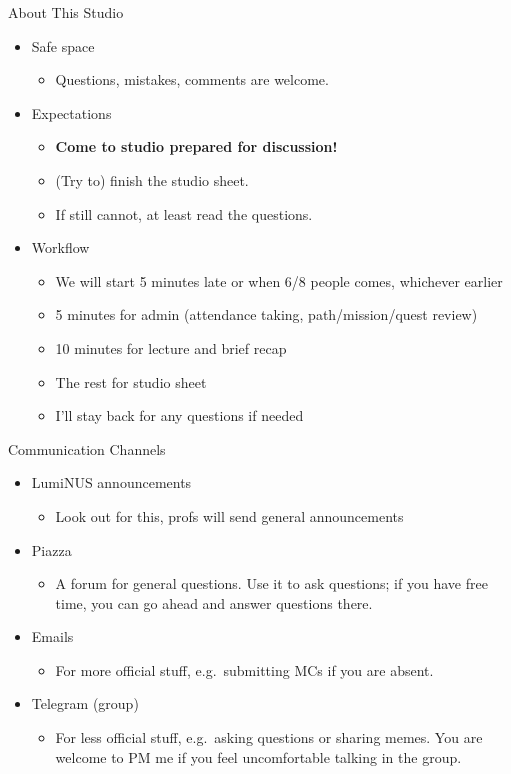 \documentclass[10pt]{beamer}
\begin{document}
\begin{frame}[fragile]{About This Studio}
\begin{itemize}
  \item Safe space
  \begin{itemize}
    \item Questions, mistakes, comments are welcome.
  \end{itemize}
  \item Expectations
  \begin{itemize}
    \item \textbf{Come to studio prepared for discussion!}
    \item (Try to) finish the studio sheet.
    \item If still cannot, at least read the questions. 
  \end{itemize}
  \item Workflow
  \begin{itemize}
    \item We will start 5 minutes late or when 6/8 people comes, whichever earlier
    \item 5 minutes for admin (attendance taking, path/mission/quest review)
    \item 10 minutes for lecture and brief recap
    \item The rest for studio sheet
    \item I'll stay back for any questions if needed
  \end{itemize}
\end{itemize} 
\end{frame}


\begin{frame}[fragile]{Communication Channels}
  \begin{itemize}
    \item LumiNUS announcements
    \begin{itemize}
      \item Look out for this, profs will send general announcements
    \end{itemize}
    \item Piazza
    \begin{itemize}
      \item A forum for general questions. Use it to ask questions; if you have free time, you can go ahead and answer questions there.
    \end{itemize}
    \item Emails
    \begin{itemize}
      \item For more official stuff, e.g.\ submitting MCs if you are absent.
    \end{itemize}
    \item Telegram (group)
    \begin{itemize}
      \item For less official stuff, e.g.\ asking questions or sharing memes. You are welcome to PM me if you feel uncomfortable talking in the group.
    \end{itemize}
  \end{itemize}
\end{frame}
\end{document}
